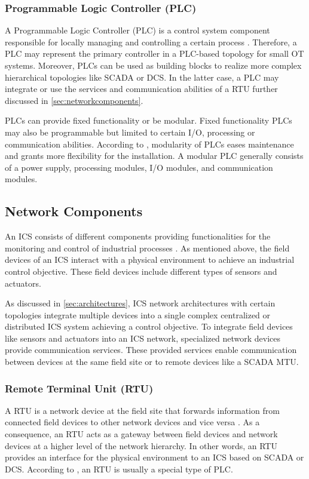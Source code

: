 \subsubsection{Programmable Logic Controller (PLC)}
A Programmable Logic Controller (PLC) is a control system component responsible for locally managing and controlling a certain process \cite{Stouffer2023}.
Therefore, a PLC may represent the primary controller in a PLC-based topology for small OT systems.
Moreover, PLCs can be used as building blocks to realize more complex hierarchical topologies like SCADA or DCS.
In the latter case, a PLC may integrate or use the services and communication abilities of a RTU further discussed in \autoref{sec:networkcomponents}.

PLCs can provide fixed functionality or be modular.
Fixed functionality PLCs may also be programmable but limited to certain I/O, processing or communication abilities.
According to \citeauthor{Galloway2013} \cite{Galloway2013}, modularity of PLCs eases maintenance and grants more flexibility for the installation.
A modular PLC generally consists of a power supply, processing modules, I/O modules, and communication modules.

\subsection{Network Components}
\label{sec:networkcomponents}
An ICS consists of different components providing functionalities for the monitoring and control of industrial processes \cite{Stouffer2023}.
As mentioned above, the field devices of an ICS interact with a physical environment to achieve an industrial control objective.
These field devices include different types of sensors and actuators.

As discussed in \autoref{sec:architectures}, ICS network architectures with certain topologies integrate multiple devices into a single complex centralized or distributed ICS system achieving a control objective.
To integrate field devices like sensors and actuators into an ICS network, specialized network devices provide communication services.
These provided services enable communication between devices at the same field site or to remote devices like a SCADA MTU. 

\subsubsection{Remote Terminal Unit (RTU)}
A RTU is a network device at the field site that forwards information from connected field devices to other network devices and vice versa \cite{Stouffer2023}.
As a consequence, an RTU acts as a gateway between field devices and network devices at a higher level of the network hierarchy.
In other words, an RTU provides an interface for the physical environment to an ICS based on SCADA or DCS.
According to \citeauthor{Galloway2013} \cite{Galloway2013}, an RTU is usually a special type of PLC. 

